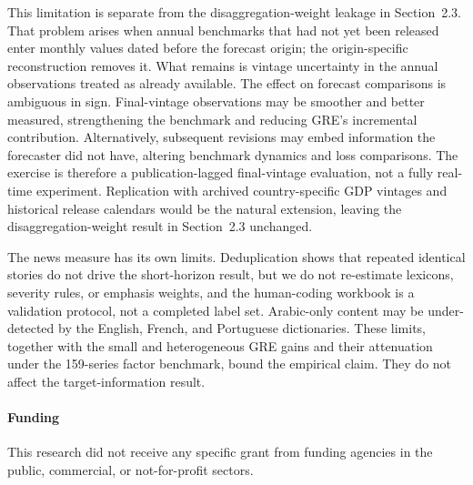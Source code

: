 \documentclass[preprint,12pt,authoryear]{elsarticle}
\begin{document}
This limitation is separate from the disaggregation-weight leakage in
Section~2.3. That problem arises when annual benchmarks that had not yet been
released enter monthly values dated before the forecast origin; the
origin-specific reconstruction removes it. What remains is vintage uncertainty
in the annual observations treated as already available. The effect on
forecast comparisons is ambiguous in sign. Final-vintage observations may be
smoother and better measured, strengthening the benchmark and reducing GRE's
incremental contribution. Alternatively, subsequent revisions may embed information the forecaster did
not have, altering benchmark dynamics and loss comparisons. The
exercise is therefore a publication-lagged final-vintage evaluation, not a
fully real-time experiment. Replication with archived country-specific GDP
vintages and historical release calendars would be the natural extension,
leaving the disaggregation-weight result in Section~2.3 unchanged.

The news measure has its own limits. Deduplication shows that repeated
identical stories do not drive the short-horizon result, but we do not
re-estimate lexicons, severity rules, or emphasis weights, and the human-coding
workbook is a validation protocol, not a completed label set. Arabic-only
content may be under-detected by the English, French, and Portuguese
dictionaries. These limits, together with the small and heterogeneous GRE
gains and their attenuation under the 159-series factor benchmark, bound the
empirical claim. They do not affect the target-information result.

\paragraph{Funding} This research did not receive any specific grant from
funding agencies in the public, commercial, or not-for-profit sectors.
\end{document}
